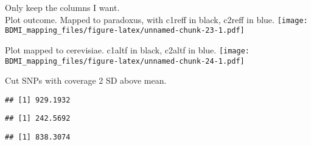 \documentclass[
]{article}
\newenvironment{Shaded}{\begin{snugshade}}{\end{snugshade}}
\newcommand{\DecValTok}[1]{\textcolor[rgb]{0.00,0.00,0.81}{#1}}
\newcommand{\FunctionTok}[1]{\textcolor[rgb]{0.13,0.29,0.53}{\textbf{#1}}}
\newcommand{\NormalTok}[1]{#1}
\newcommand{\OtherTok}[1]{\textcolor[rgb]{0.56,0.35,0.01}{#1}}
\newcommand{\SpecialCharTok}[1]{\textcolor[rgb]{0.81,0.36,0.00}{\textbf{#1}}}
\begin{document}
Only keep the columns I want.\\

Plot outcome. Mapped to paradoxus, with c1reff in black, c2reff in blue.
\texttt{[image: BDMI\_mapping\_files/figure-latex/unnamed-chunk-23-1.pdf]}

Plot mapped to cerevisiae. c1altf in black, c2altf in blue.
\texttt{[image: BDMI\_mapping\_files/figure-latex/unnamed-chunk-24-1.pdf]}

Cut SNPs with coverage 2 SD above mean.\\

\begin{Shaded}
\end{Shaded}

\begin{verbatim}
## [1] 929.1932
\end{verbatim}

\begin{Shaded}
\end{Shaded}

\begin{verbatim}
## [1] 242.5692
\end{verbatim}

\begin{Shaded}
\end{Shaded}

\begin{verbatim}
## [1] 838.3074
\end{verbatim}

\begin{Shaded}
\end{Shaded}
\end{document}
